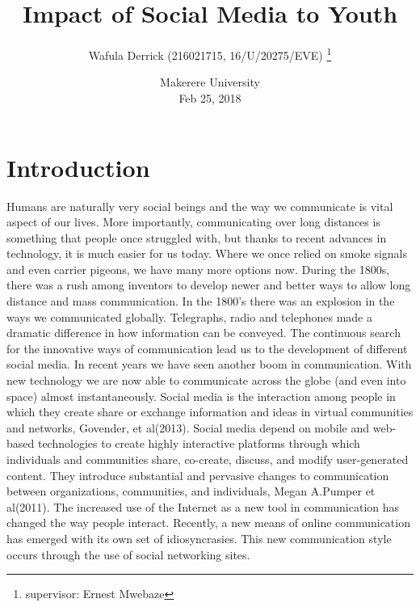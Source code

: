 \documentclass[options]{article}
\title{Impact of Social Media to Youth}
\author{Wafula Derrick (216021715, 16/U/20275/EVE) \thanks{supervisor: Ernest Mwebaze}}
\date{%
    Makerere University\\%
    Feb 25, 2018
}
\begin{document}
\begin{titlepage}
\maketitle
\end{titlepage}





\section{\textbf{ Introduction}} 
Humans are naturally very social beings and the way we communicate is vital aspect of our lives. More importantly, communicating over long distances is something that people once struggled with, but thanks to recent advances in technology, it is much easier for us today. Where we once relied on smoke signals and even carrier pigeons, we have many more options now. During the 1800s, there was a rush among inventors to develop newer and better ways to allow long distance and mass communication. In the 1800’s there was an explosion in the ways we communicated globally. Telegraphs, radio and telephones made a dramatic difference in how information can be conveyed. The continuous search for the innovative ways of communication lead us to the development of different social media. In recent years we have seen another boom in communication. With new technology we are now able to communicate across the globe (and even into space) almost instantaneously.
Social media is the interaction among people in which they create share or exchange information and ideas in virtual communities and networks, Govender, et al(2013). Social media depend on mobile and web-based technologies to create highly interactive platforms through which individuals and communities share, co-create, discuss, and modify user-generated content. They introduce substantial and pervasive changes to communication between organizations, communities, and individuals, Megan A.Pumper et al(2011). The increased use of the Internet as a new tool in communication has changed the way people interact. Recently, a new means of online communication has emerged with its own set of idiosyncrasies. This new communication style occurs through the use of social networking sites.
\end{document}
